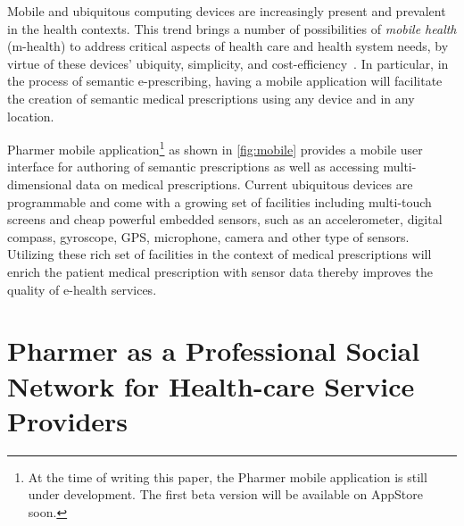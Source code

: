 \documentclass[journal]{IEEEtran}
\begin{document}
Mobile and ubiquitous computing devices are increasingly present and prevalent in the health contexts.
This trend brings a number of possibilities of \emph{mobile health} (m-health) to address critical aspects of health care and health system needs, by virtue of these devices’ ubiquity, simplicity, and cost-efficiency~\cite{mHealth}.
In particular, in the process of semantic e-prescribing, having a mobile application will facilitate the creation of semantic medical prescriptions using any device and in any location.

Pharmer mobile application\footnote{ At the time of writing this paper, the Pharmer mobile application is still under development. The first beta version will be available on AppStore soon.} as shown in \autoref{fig:mobile} provides a mobile user interface for authoring of semantic prescriptions as well as accessing multi-dimensional data on medical prescriptions.
Current ubiquitous devices are programmable and come with a growing set of facilities including multi-touch screens and cheap powerful embedded sensors, such as an accelerometer, digital compass, gyroscope, GPS, microphone, camera and other type of sensors.
Utilizing these rich set of facilities in the context of medical prescriptions will enrich the patient medical prescription with sensor data thereby improves the quality of e-health services.

\section{Pharmer as a Professional Social Network for Health-care Service Providers}
\label{pharmernet}
\end{document}
